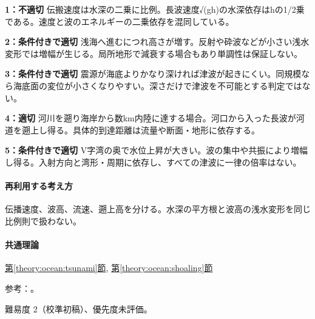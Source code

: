 \noindent\textbf{1：不適切} 伝搬速度は水深の二乗に比例。長波速度√(gh)の水深依存はhの1/2乗である。速度と波のエネルギーの二乗依存を混同している。\par

\noindent\textbf{2：条件付きで適切} 浅海へ進むにつれ高さが増す。反射や砕波などが小さい浅水変形では増幅が生じる。局所地形で減衰する場合もあり単調性は保証しない。\par

\noindent\textbf{3：条件付きで適切} 震源が海底よりかなり深ければ津波が起きにくい。同規模なら海底面の変位が小さくなりやすい。深さだけで津波を不可能とする判定ではない。\par

\noindent\textbf{4：適切} 河川を遡り海岸から数km内陸に達する場合。河口から入った長波が河道を遡上し得る。具体的到達距離は流量や断面・地形に依存する。\par

\noindent\textbf{5：条件付きで適切} V字湾の奥で水位上昇が大きい。波の集中や共振により増幅し得る。入射方向と湾形・周期に依存し、すべての津波に一律の倍率はない。\par

\paragraph{再利用する考え方} 伝播速度、波高、流速、遡上高を分ける。水深の平方根と波高の浅水変形を同じ比例則で扱わない。

\paragraph{共通理論} \hyperref[theory:ocean:tsunami]{第\ref*{theory:ocean:tsunami}節}, \hyperref[theory:ocean:shoaling]{第\ref*{theory:ocean:shoaling}節}

\par 参考：\cite{jma_tsunami_generation,jma_tsunami_prediction,jma_tsunami_rivers}。

\par 難易度 2（校準初稿）、優先度未評価。

